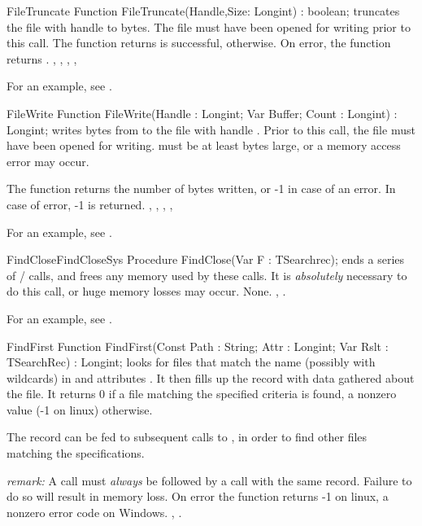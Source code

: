 
\begin{function}{FileTruncate}
\Declaration
Function FileTruncate(Handle,Size: Longint) : boolean;
\Description
{} truncates the file with handle  to
 bytes. The file must have been opened for writing prior
to this call. The function returns  is successful, 
otherwise.
\Errors
On error, the function returns .
\SeeAlso
{}, , , 
, 
\end{function}

For an example, see .
 
\begin{function}{FileWrite}
\Declaration
Function FileWrite(Handle : Longint; Var Buffer; Count : Longint) : Longint;
\Description
{} writes  bytes from  to the file with
handle . Prior to this call, the file must have been opened 
for writing.  must be at least  bytes large, or 
a memory access error may occur.

The function returns the number of bytes written, or -1 in case of an
error.
\Errors
In case of error, -1 is returned.
\SeeAlso
{}, , 
, , 
\end{function}

For an example, see . 

\begin{procedurel}{FindClose}{FindCloseSys}
\Declaration
Procedure FindClose(Var F : TSearchrec);
\Description
{} ends a series of / calls,
and frees any memory used by these calls. It is {\em absolutely} necessary
to do this call, or huge memory losses may occur.
\Errors
None.
\SeeAlso
{}, .
\end{procedurel}

For an example, see .
 
\begin{function}{FindFirst}
\Declaration
Function FindFirst(Const Path : String; Attr : Longint; Var Rslt : TSearchRec) : Longint;
\Description
{} looks for files that match the name (possibly with
wildcards) in  and attributes . It then fills up the
 record with data gathered about the file. It returns 0 if a file
matching the specified criteria is found, a nonzero value (-1 on linux) 
otherwise.

The  record can be fed to subsequent calls to , in
order to find other files matching the specifications.

{\em remark:} A  call must {\em always} be followed by a
 call with the same  record. Failure to do so will
result in memory loss.
\Errors
On error the function returns -1 on linux, a nonzero error code on Windows.
\SeeAlso
{}, .
\end{function}

